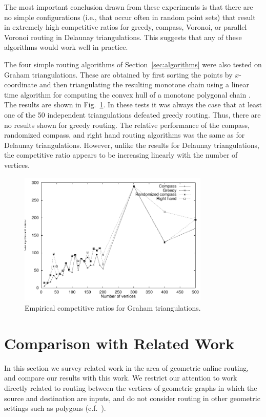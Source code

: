 \documentclass[final]{siamltex}
\newcommand{\seclabel}[1]{\label{sec:#1}}
\newcommand{\secref}[1]{\mbox{Section~\ref{sec:#1}}}
\newcommand{\figlabel}[1]{\label{fig:#1}}
\newcommand{\figref}[1]{\mbox{Fig.~\ref{fig:#1}}}
\begin{document}
The most important conclusion drawn from these experiments is that there
are no simple configurations (i.e., that occur often in random point
sets) that result in extremely high competitive ratios for greedy,
compass, Voronoi, or parallel Voronoi routing in Delaunay
triangulations.  This suggests that any of these algorithms would work
well in practice.

The four simple routing algorithms of \secref{algorithms} were also
tested on Graham triangulations.  These are obtained by first sorting
the points by $x$-coordinate and then triangulating the resulting
monotone chain using a linear time algorithm for computing the convex
hull of a monotone polygonal chain \cite{ps85}.  The results are shown
in \figref{graham}. In these tests it was always the case that at
least one of the 50 independent triangulations defeated greedy
routing.  Thus, there are no results shown for greedy routing.  The
relative performance of the compass, randomized compass, and right
hand routing algorithms was the same as for Delaunay triangulations.
However, unlike the results for Delaunay triangulations, the
competitive ratio appears to be increasing linearly with the number of
vertices.

\begin{figure}
\centerline{\includegraphics[height=2.5in]{graham}}
\caption{Empirical competitive ratios for Graham triangulations.}
\figlabel{graham}
\end{figure}

\section{Comparison with Related Work}\seclabel{related}

In this section we survey related work in the area of geometric online
routing, and compare our results with this work.  We restrict our
attention to work directly related to routing between the vertices of
geometric graphs in which the source and destination are inputs, and
do not consider routing in other geometric settings such as polygons
(c.f.\ \cite{gs97,ik95,k92}).
\end{document}
